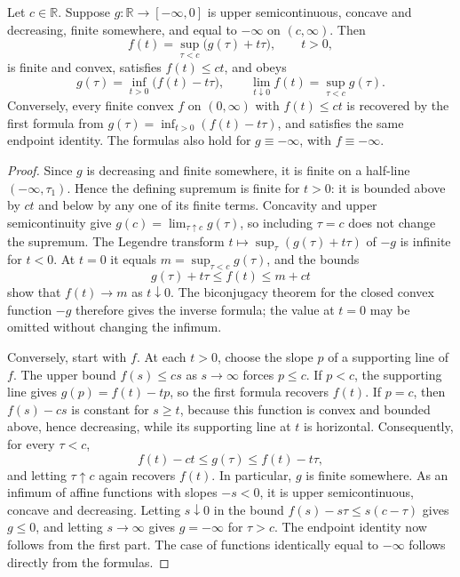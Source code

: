 \begin{lemma}\label{lem:halfline-legendre-duality}
Let $c\in\mathbb R$. Suppose $g\colon\mathbb R\to[-\infty,0]$ is upper semicontinuous, concave and decreasing, finite somewhere, and equal to $-\infty$ on $(c,\infty)$. Then
\[
 f(t)=\sup_{\tau<c}\bigl(g(\tau)+t\tau\bigr),\qquad t>0,
\]
is finite and convex, satisfies $f(t)\leq ct$, and obeys
\[
 g(\tau)=\inf_{t>0}\bigl(f(t)-t\tau\bigr),\qquad
 \lim_{t\downarrow0}f(t)=\sup_{\tau<c}g(\tau).
\]
Conversely, every finite convex $f$ on $(0,\infty)$ with $f(t)\leq ct$ is recovered by the first formula from $g(\tau)=\inf_{t>0}(f(t)-t\tau)$, and satisfies the same endpoint identity. The formulas also hold for $g\equiv-\infty$, with $f\equiv-\infty$.
\end{lemma}
\begin{proof}
Since $g$ is decreasing and finite somewhere, it is finite on a half-line $(-\infty,\tau_1)$. Hence the defining supremum is finite for $t>0$: it is bounded above by $ct$ and below by any one of its finite terms. Concavity and upper semicontinuity give $g(c)=\lim_{\tau\uparrow c}g(\tau)$, so including $\tau=c$ does not change the supremum. The Legendre transform $t\mapsto\sup_\tau(g(\tau)+t\tau)$ of $-g$ is infinite for $t<0$. At $t=0$ it equals $m=\sup_{\tau<c}g(\tau)$, and the bounds
\[
 g(\tau)+t\tau\leq f(t)\leq m+ct
\]
show that $f(t)\to m$ as $t\downarrow0$. The biconjugacy theorem for the closed convex function $-g$ therefore gives the inverse formula; the value at $t=0$ may be omitted without changing the infimum.

Conversely, start with $f$. At each $t>0$, choose the slope $p$ of a supporting line of $f$. The upper bound $f(s)\leq cs$ as $s\to\infty$ forces $p\leq c$. If $p<c$, the supporting line gives $g(p)=f(t)-tp$, so the first formula recovers $f(t)$. If $p=c$, then $f(s)-cs$ is constant for $s\geq t$, because this function is convex and bounded above, hence decreasing, while its supporting line at $t$ is horizontal. Consequently, for every $\tau<c$,
\[
 f(t)-ct\leq g(\tau)\leq f(t)-t\tau,
\]
and letting $\tau\uparrow c$ again recovers $f(t)$. In particular, $g$ is finite somewhere. As an infimum of affine functions with slopes $-s<0$, it is upper semicontinuous, concave and decreasing. Letting $s\downarrow0$ in the bound $f(s)-s\tau\leq s(c-\tau)$ gives $g\leq0$, and letting $s\to\infty$ gives $g=-\infty$ for $\tau>c$. The endpoint identity now follows from the first part. The case of functions identically equal to $-\infty$ follows directly from the formulas.
\end{proof}

